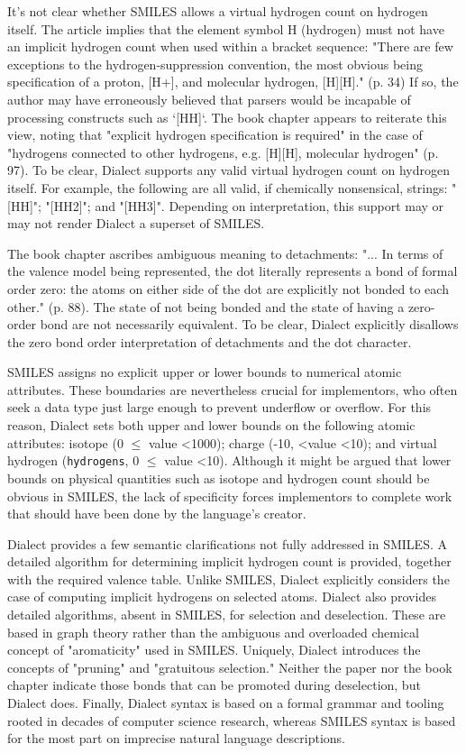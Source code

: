 \documentclass{article}
\def\ttt{\texttt}
\begin{document}
It's not clear whether SMILES allows a virtual hydrogen count on hydrogen itself. The article implies that the element symbol H (hydrogen) must not have an implicit hydrogen count when used within a bracket sequence: "There are few exceptions to the hydrogen-suppression convention, the most obvious being specification of a proton, [H+], and molecular hydrogen, [H][H]." (p. 34) If so, the author may have erroneously believed that parsers would be incapable of processing constructs such as `[HH]`. The book chapter appears to reiterate this view, noting that "explicit hydrogen specification is required" in the case of "hydrogens connected to other hydrogens, e.g. [H][H], molecular hydrogen" (p. 97). To be clear, Dialect supports any valid virtual hydrogen count on hydrogen itself. For example, the following are all valid, if chemically nonsensical, strings: "[HH]"; "[HH2]"; and "[HH3]". Depending on interpretation, this support may or may not render Dialect a superset of SMILES.

The book chapter ascribes ambiguous meaning to detachments: "... In terms of the valence model being represented, the dot literally represents a bond of formal order zero: the atoms on either side of the dot are explicitly not bonded to each other." (p. 88). The state of not being bonded and the state of having a zero-order bond are not necessarily equivalent.\cite{clark2011} To be clear, Dialect explicitly disallows the zero bond order interpretation of detachments and the dot character.

SMILES assigns no explicit upper or lower bounds to numerical atomic attributes. These boundaries are nevertheless crucial for implementors, who often seek a data type just large enough to prevent underflow or overflow. For this reason, Dialect sets both upper and lower bounds on the following atomic attributes: isotope (0 $\leq$ value \textless 1000); charge (-10, \textless value \textless 10); and virtual hydrogen (\ttt{hydrogens}, 0 $\leq$ value \textless 10). Although it might be argued that lower bounds on physical quantities such as isotope and hydrogen count should be obvious in SMILES, the lack of specificity forces implementors to complete work that should have been done by the language's creator.

Dialect provides a few semantic clarifications not fully addressed in SMILES. A detailed algorithm for determining implicit hydrogen count is provided, together with the required valence table. Unlike SMILES, Dialect explicitly considers the case of computing implicit hydrogens on selected atoms. Dialect also provides detailed algorithms, absent in SMILES, for selection and deselection. These are based in graph theory rather than the ambiguous and overloaded chemical concept of "aromaticity" used in SMILES. Uniquely, Dialect introduces the concepts of "pruning" and "gratuitous selection." Neither the paper nor the book chapter indicate those bonds that can be promoted during deselection, but Dialect does. Finally, Dialect syntax is based on a formal grammar and tooling rooted in decades of computer science research, whereas SMILES syntax is based for the most part on imprecise natural language descriptions.
\end{document}
